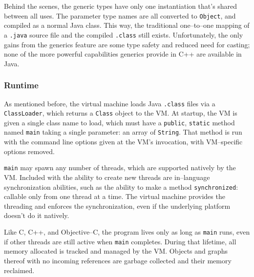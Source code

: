 Behind the scenes, the generic types have only one instantiation that's shared
between all uses. The parameter type names are all converted to
\texttt{Object}, and compiled as a normal Java class. This way, the
traditional one--to--one mapping of a \texttt{.java} source file and the
compiled \texttt{.class} still exists. Unfortunately, the only gains from the
generics feature are some type safety and reduced need for casting; none of
the more powerful capabilities generics provide in C++ are available in Java.


\subsubsection{Runtime}

As mentioned before, the virtual machine loads Java \texttt{.class} files via
a \texttt{ClassLoader}, which returns a \texttt{Class} object to the VM. At
startup, the VM is given a single class name to load, which must have a
\texttt{public}, \texttt{static} method named \texttt{main} taking a single
parameter: an array of \texttt{String}. That method is run with the command
line options given at the VM's invocation, with VM--specific options removed.

\texttt{main} may spawn any number of threads, which are supported natively by
the VM. Included with the ability to create new threads are in--language
synchronization abilities, such as the ability to make a method
\texttt{synchronized}: callable only from one thread at a time. The virtual
machine provides the threading and enforces the synchronization, even if the
underlying platform doesn't do it natively.

Like C, C++, and Objective--C, the program lives only as long as \texttt{main}
runs, even if other threads are still active when \texttt{main} completes.
During that lifetime, all memory allocated is tracked and managed by the VM.
Objects and graphs thereof with no incoming references are garbage collected
and their memory reclaimed.

